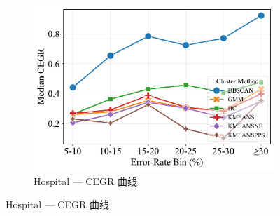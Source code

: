 \documentclass[10pt]{article} %
\numberwithin{equation}{section}
\begin{document}
\begin{enumerate}[label=(\alph*)]
\begin{figure}[H]
\begin{subfigure}[b]{0.33\linewidth}
    \includegraphics[width=\linewidth]{figures/6.4.3graph/CEGR_5pct_hospital.pdf}
    \caption{Hospital — CEGR 曲线}
    \label{fig:ho_cegr}
  \end{subfigure}


\end{figure}
\end{enumerate}
\end{document}
